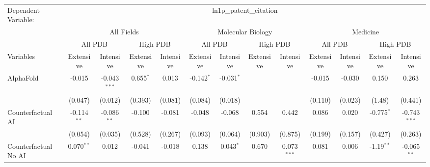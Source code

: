 \begingroup
\centering
\begin{tabular}{lcccccccccccc}
   \tabularnewline \midrule \midrule
   Dependent Variable: & \multicolumn{12}{c}{ln1p\_patent\_citation}\\
 & \multicolumn{4}{c}{All Fields} & \multicolumn{4}{c}{Molecular Biology} & \multicolumn{4}{c}{Medicine} \\
\cmidrule(lr){2-5} \cmidrule(lr){6-9} \cmidrule(lr){10-13}
 & \multicolumn{2}{c}{All PDB} & \multicolumn{2}{c}{High PDB} & \multicolumn{2}{c}{All PDB} & \multicolumn{2}{c}{High PDB} & \multicolumn{2}{c}{All PDB} & \multicolumn{2}{c}{High PDB} \\
\cmidrule(lr){2-3} \cmidrule(lr){4-5} \cmidrule(lr){6-7} \cmidrule(lr){8-9} \cmidrule(lr){10-11} \cmidrule(lr){12-13}
Variables & \multicolumn{1}{c}{Extensive} & \multicolumn{1}{c}{Intensive} & \multicolumn{1}{c}{Extensive} & \multicolumn{1}{c}{Intensive} & \multicolumn{1}{c}{Extensive} & \multicolumn{1}{c}{Intensive} & \multicolumn{1}{c}{Extensive} & \multicolumn{1}{c}{Intensive} & \multicolumn{1}{c}{Extensive} & \multicolumn{1}{c}{Intensive} & \multicolumn{1}{c}{Extensive} & \multicolumn{1}{c}{Intensive} \\
\cmidrule(lr){1-1}\cmidrule(lr){2-2} \cmidrule(lr){3-3} \cmidrule(lr){4-4} \cmidrule(lr){5-5} \cmidrule(lr){6-6} \cmidrule(lr){7-7} \cmidrule(lr){8-8} \cmidrule(lr){9-9} \cmidrule(lr){10-10} \cmidrule(lr){11-11} \cmidrule(lr){12-12} \cmidrule(lr){13-13}
   AlphaFold                                & -0.015        & -0.043$^{***}$ & 0.655$^{*}$ & 0.013   & -0.142$^{*}$ & -0.031$^{*}$  &         &               & -0.015  & -0.030       & 0.150        & 0.263\\   
                                            & (0.047)       & (0.012)        & (0.393)     & (0.081) & (0.084)      & (0.018)       &         &               & (0.110) & (0.023)      & (1.48)       & (0.441)\\   
   Counterfactual AI                        & -0.114$^{**}$ & -0.086$^{**}$  & -0.100      & -0.081  & -0.048       & -0.068        & 0.554   & 0.442         & 0.086   & 0.020        & -0.775$^{*}$ & -0.743$^{***}$\\   
                                            & (0.054)       & (0.035)        & (0.528)     & (0.267) & (0.093)      & (0.064)       & (0.903) & (0.875)       & (0.199) & (0.157)      & (0.427)      & (0.263)\\   
   Counterfactual No AI                     & 0.070$^{**}$  & 0.012          & -0.041      & -0.018  & 0.138        & 0.043$^{*}$   & 0.670   & 0.073$^{***}$ & 0.081   & 0.006        & -1.19$^{**}$ & -0.065$^{**}$\\   

\end{tabular}
